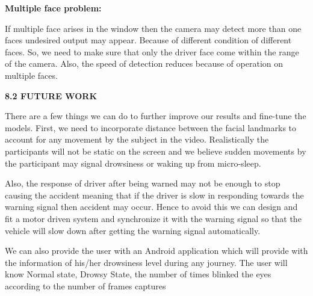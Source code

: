 \documentclass[a4paper,12pt]{article}
\begin{document}
\textbf{Multiple face problem:}

If multiple face arises in the window then the camera may detect more
than one faces undesired output may appear. Because of different
condition of different faces. So, we need to make sure that only the
driver face come within the range of the camera. Also, the speed of
detection reduces because of operation on multiple faces.

\textbf{8.2 FUTURE WORK}

There are a few things we can do to further improve our results and
fine-tune the models. First, we need to incorporate distance between the
facial landmarks to account for any movement by the subject in the
video. Realistically the participants will not be static on the screen
and we believe sudden movements by the participant may signal drowsiness
or waking up from micro-sleep.

Also, the response of driver after being warned may not be enough to
stop causing the accident meaning that if the driver is slow in
responding towards the warning signal then accident may occur. Hence to
avoid this we can design and fit a motor driven system and synchronize
it with the warning signal so that the vehicle will slow down after
getting the warning signal automatically.

We can also provide the user with an Android application which will
provide with the information of his/her drowsiness level during any
journey. The user will know Normal state, Drowsy State, the number of
times blinked the eyes according to the number of frames captures
\end{document}
